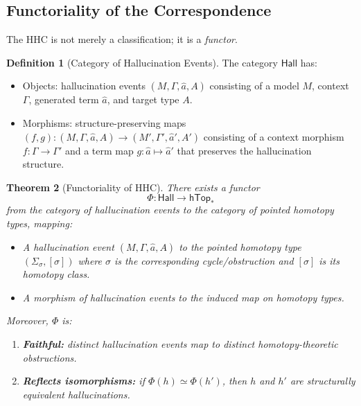 \documentclass[11pt,a4paper]{article}
\theoremstyle{plain}
\newtheorem{theorem}{Theorem}[section]
\theoremstyle{definition}
\newtheorem{definition}[theorem]{Definition}
\begin{document}
\subsection{Functoriality of the Correspondence}

The HHC is not merely a classification; it is a \emph{functor}.

\begin{definition}[Category of Hallucination Events]\label{def:hallcat}
The category $\mathsf{Hall}$ has:
\begin{itemize}[nosep]
  \item Objects: hallucination events $(M, \Gamma, \hat{a}, A)$ consisting of a model $M$, context $\Gamma$, generated term $\hat{a}$, and target type $A$.
  \item Morphisms: structure-preserving maps $(f, g)\colon (M, \Gamma, \hat{a}, A) \to (M', \Gamma', \hat{a}', A')$ consisting of a context morphism $f\colon \Gamma \to \Gamma'$ and a term map $g\colon \hat{a} \mapsto \hat{a}'$ that preserves the hallucination structure.
\end{itemize}
\end{definition}

\begin{theorem}[Functoriality of HHC]\label{thm:functor}
There exists a functor
\begin{equation}\label{eq:hhcfunctor}
  \Phi\colon \mathsf{Hall} \to \mathsf{hTop}_*
\end{equation}
from the category of hallucination events to the category of pointed homotopy types, mapping:
\begin{itemize}[nosep]
  \item A hallucination event $(M, \Gamma, \hat{a}, A)$ to the pointed homotopy type $(\Sigma_\sigma, [\sigma])$ where $\sigma$ is the corresponding cycle/obstruction and $[\sigma]$ is its homotopy class.
  \item A morphism of hallucination events to the induced map on homotopy types.
\end{itemize}
Moreover, $\Phi$ is:
\begin{enumerate}[nosep]
  \item \textbf{Faithful:} distinct hallucination events map to distinct homotopy-theoretic obstructions.
  \item \textbf{Reflects isomorphisms:} if $\Phi(h) \simeq \Phi(h')$, then $h$ and $h'$ are structurally equivalent hallucinations.
\end{enumerate}
\end{theorem}
\end{document}
